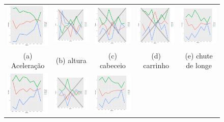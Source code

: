 \documentclass[review]{elsarticle}
\begin{document}
\begin{figure}[!bp]
\begin{tabular}{ccccc}
  \includegraphics[width=25mm]{aceleracao_result} & \includegraphics[width=25mm]{altura_result} & \includegraphics[width=25mm]{cabeceio_result} &   \includegraphics[width=25mm]{carrinho_result} &
  \includegraphics[width=25mm]{ch_delonge_result} \\
\scriptsize{(a) Aceleração } & \scriptsize{(b) altura  } & \scriptsize{(c) cabeceio } & \scriptsize{(d) carrinho } & \scriptsize{(e) chute de longe }\\[3pt]
\includegraphics[width=25mm]{cobr_falta_result} & \includegraphics[width=25mm]{combativ__result} &   \includegraphics[width=25mm]{contr_bola_result} &

\end{tabular}
\end{figure}
\end{document}
